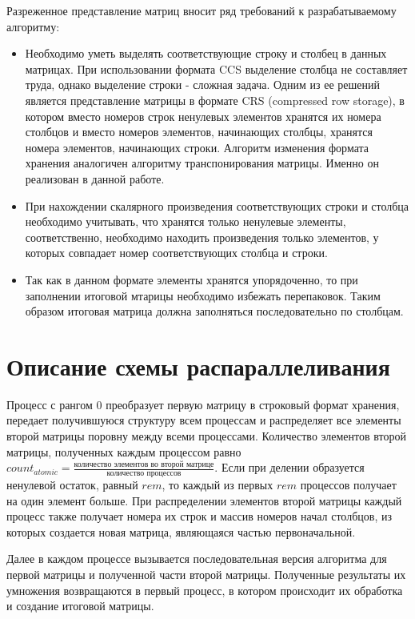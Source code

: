 \documentclass{report}
\begin{document}
\par Разреженное представление матриц вносит ряд требований к разрабатываемому алгоритму:
\begin{itemize}
\item Необходимо уметь выделять соответствующие строку и столбец в данных матрицах. При использовании формата CCS выделение столбца не составляет труда, однако выделение строки - сложная задача. Одним из ее решений является представление матрицы в формате CRS (compressed row storage), в котором вместо номеров строк ненулевых элементов хранятся их номера столбцов и вместо номеров элементов, начинающих столбцы, хранятся номера элементов, начинающих строки. Алгоритм изменения формата хранения аналогичен алгоритму транспонирования матрицы. Именно он реализован в данной работе.
\item При нахождении скалярного произведения соответствующих строки и столбца необходимо учитывать, что хранятся только ненулевые элементы, соответственно, необходимо находить произведения только элементов, у которых совпадает номер соответствующих столбца и строки.
\item Так как в данном формате элементы хранятся упорядоченно, то при заполнении итоговой мтарицы необходимо избежать перепаковок. Таким образом итоговая матрица должна заполняться последовательно по столбцам.
\end{itemize}

\clearpage

\section*{Описание схемы распараллеливания}

\par Процесс с рангом 0 преобразует первую матрицу в строковый формат хранения, передает получившуюся структуру всем процессам и распределяет все элементы второй матрицы поровну между всеми процессами. Количество элементов второй матрицы, полученных каждым процессом равно \( {count}_{atomic} = \frac{\text{количество элементов во второй матрице}}{\text{количество процессов}} \). Если при делении образуется ненулевой остаток, равный \( rem \), то каждый из первых \( rem \) процессов получает на один элемент больше. При распределении элементов второй матрицы каждый процесс также получает номера их строк и массив номеров начал столбцов, из которых создается новая матрица, являющаяся частью первоначальной.
\par Далее в каждом процессе вызывается последовательная версия алгоритма для первой матрицы и полученной части второй матрицы. Полученные результаты их умножения возвращаются в первый процесс, в котором происходит их обработка и создание итоговой матрицы.
\clearpage
\end{document}
